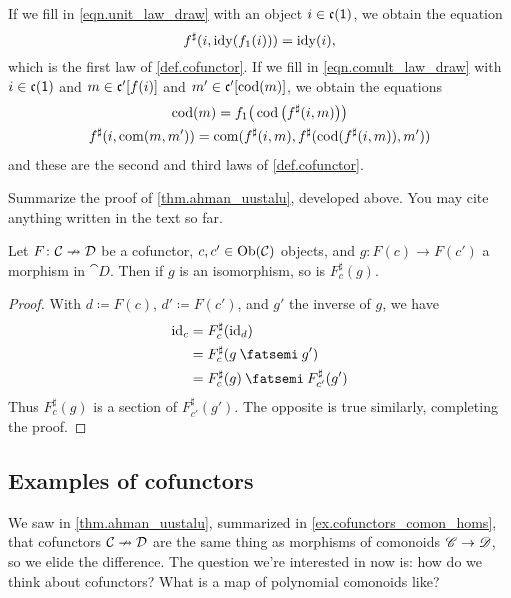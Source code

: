 \documentclass[Book-Poly]{subfiles}
\begin{document}
If we fill in \eqref{eqn.unit_law_draw} with an object $i\in\mathfrak{c}(\textsf{1})$, we obtain the equation
\[f^\sharp(i,\operatorname{idy}(f_1(i)))=\operatorname{idy}(i),\]
which is the first law of \cref{def.cofunctor}. If we fill in \eqref{eqn.comult_law_draw} with $i\in\mathfrak{c}(\textsf{1})$ and $m\in\mathfrak{c}'[f(i)]$ and $m'\in\mathfrak{c}'[\operatorname{cod}(m)]$, we obtain the equations
\begin{gather*}
  \operatorname{cod}(m)=f_1\big(\operatorname{cod}\big(f^\sharp(i,m)\big)\big)\\
  f^\sharp(i,\operatorname{com}(m,m'))=\operatorname{com}(f^\sharp(i,m),f^\sharp(\operatorname{cod}(f^\sharp(i,m)),m'))
\end{gather*}
and these are the second and third laws of \cref{def.cofunctor}.

\begin{exercise}\label{ex.cofunctors_comon_homs}
Summarize the proof of \cref{thm.ahman_uustalu}, developed above. You may cite anything written in the text so far.
\end{exercise}

\begin{proposition}\label{prop.cofunctors_isos}
Let $F\colon\mathcal{C}\nrightarrow\mathcal{D}$ be a cofunctor, $c,c'\in\operatorname{Ob}(\mathcal{C})$ objects, and $g\colon F(c)\to F(c')$ a morphism in $\cat{D}$. Then if $g$ is an isomorphism, so is $F^\sharp_{c}(g)$.
\end{proposition}
\begin{proof}
With $d\coloneqq F(c)$, $d'\coloneqq F(c')$, and $g'$ the inverse of $g$, we have
\begin{align*}
	\id_c&=
	F^\sharp_c(\id_d)\\&=
	F^\sharp_c(g\then g')\\&=
	F^\sharp_c(g)\then F^\sharp_{c'}(g')
\end{align*}
Thus $F^\sharp_{c}(g)$ is a section of $F^\sharp_{c'}(g')$. The opposite is true similarly, completing the proof.
\end{proof}

\subsection{Examples of cofunctors}

We saw in \cref{thm.ahman_uustalu}, summarized in \cref{ex.cofunctors_comon_homs}, that cofunctors $\mathcal{C}\nrightarrow\mathcal{D}$ are the same thing as morphisms of comonoids $\mathscr{C}\to\mathscr{D}$, so we elide the difference. The question we're interested in now is: how do we think about cofunctors? What is a map of polynomial comonoids like?
\end{document}
